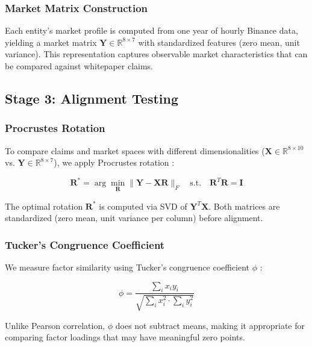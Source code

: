 \documentclass[11pt,twocolumn]{article}
\begin{document}
\subsubsection{Market Matrix Construction}

Each entity's market profile is computed from one year of hourly Binance data, yielding a market matrix $\mathbf{Y} \in \mathbb{R}^{8 \times 7}$ with standardized features (zero mean, unit variance). This representation captures observable market characteristics that can be compared against whitepaper claims.

\subsection{Stage 3: Alignment Testing}

\subsubsection{Procrustes Rotation}

To compare claims and market spaces with different dimensionalities ($\mathbf{X} \in \mathbb{R}^{8 \times 10}$ vs. $\mathbf{Y} \in \mathbb{R}^{8 \times 7}$), we apply Procrustes rotation \citep{Gower1975Generalized}:

\begin{equation}
\mathbf{R}^* = \arg\min_{\mathbf{R}} \|\mathbf{Y} - \mathbf{X}\mathbf{R}\|_F \quad \text{s.t.} \quad \mathbf{R}^T\mathbf{R} = \mathbf{I}
\label{eq:procrustes}
\end{equation}

The optimal rotation $\mathbf{R}^*$ is computed via SVD of $\mathbf{Y}^T\mathbf{X}$. Both matrices are standardized (zero mean, unit variance per column) before alignment.

\subsubsection{Tucker's Congruence Coefficient}

We measure factor similarity using Tucker's congruence coefficient $\phi$ \citep{Tucker1951Method,Lorenzo-Seva2006Tucker}:

\begin{equation}
\phi = \frac{\sum_i x_i y_i}{\sqrt{\sum_i x_i^2 \cdot \sum_i y_i^2}}
\label{eq:tucker-phi}
\end{equation}

Unlike Pearson correlation, $\phi$ does not subtract means, making it appropriate for comparing factor loadings that may have meaningful zero points.
\end{document}

